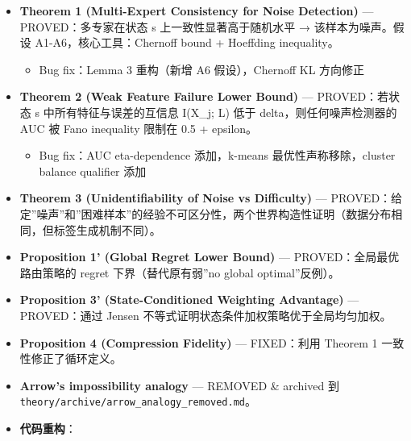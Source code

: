 \documentclass[
  12pt,
]{ctexart}
\providecommand{\tightlist}{%
  \setlength{\itemsep}{0pt}\setlength{\parskip}{0pt}}
\begin{document}
\begin{itemize}
\tightlist
\item
  \textbf{Theorem 1 (Multi-Expert Consistency for Noise Detection)} ---
  PROVED：多专家在状态 s 上一致性显著高于随机水平 → 该样本为噪声。假设
  A1-A6，核心工具：Chernoff bound + Hoeffding inequality。

  \begin{itemize}
  \tightlist
  \item
    Bug fix：Lemma 3 重构（新增 A6 假设），Chernoff KL 方向修正
  \end{itemize}
\item
  \textbf{Theorem 2 (Weak Feature Failure Lower Bound)} ---
  PROVED：若状态 s 中所有特征与误差的互信息 I(X\_j; L) 低于
  delta，则任何噪声检测器的 AUC 被 Fano inequality 限制在 0.5 +
  epsilon。

  \begin{itemize}
  \tightlist
  \item
    Bug fix：AUC eta-dependence 添加，k-means 最优性声称移除，cluster
    balance qualifier 添加
  \end{itemize}
\item
  \textbf{Theorem 3 (Unidentifiability of Noise vs Difficulty)} ---
  PROVED：给定''噪声''和''困难样本''的经验不可区分性，两个世界构造性证明（数据分布相同，但标签生成机制不同）。
\item
  \textbf{Proposition 1' (Global Regret Lower Bound)} ---
  PROVED：全局最优路由策略的 regret 下界（替代原有弱''no global
  optimal''反例）。
\item
  \textbf{Proposition 3' (State-Conditioned Weighting Advantage)} ---
  PROVED：通过 Jensen 不等式证明状态条件加权策略优于全局均匀加权。
\item
  \textbf{Proposition 4 (Compression Fidelity)} --- FIXED：利用 Theorem
  1 一致性修正了循环定义。
\item
  \textbf{Arrow's impossibility analogy} --- REMOVED \& archived 到
  \texttt{theory/archive/arrow\_analogy\_removed.md}。
\item
  \textbf{代码重构}：


\end{itemize}
\end{document}
